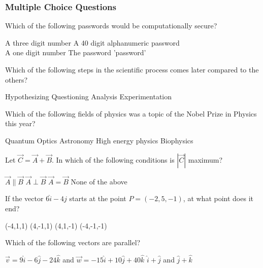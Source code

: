 \documentclass[12pt,addpoints]{exam}
\begin{document}
{{{				\subsubsection*{Multiple Choice Questions}
				\begin{questions}
					\question Which of the following passwords would be computationally secure?\\
					\begin{oneparchoices}
						\choice A three digit number
						\choice A 40 digit alphanumeric password \\
						\choice A one digit number
						\choice The password 'password'
					\end{oneparchoices}
					\question Which of the following steps in the scientific process comes later compared to the others? \\
					\begin{oneparchoices}
						\choice Hypothesizing
						\choice Questioning
						\choice Analysis
						\choice Experimentation
					\end{oneparchoices}
					\question Which of the following fields of physics was a topic of the Nobel Prize in Physics this year? \\
					\begin{oneparchoices}
						\choice Quantum Optics
						\choice Astronomy
						\choice High energy physics
						\choice Biophysics
					\end{oneparchoices}
					\question Let $\vec{C}=\vec{A}+\vec{B}$. In which of the following conditions is $|\vec{C}|$ maximum? \\
					\begin{oneparchoices}
						\choice $\vec{A}\parallel\vec{B}$
						\choice $\vec{A}\perp\vec{B}$
						\choice $\vec{A}=\vec{B}$
						\choice None of the above
					\end{oneparchoices}
					\question If the vector $6\hat{i}-4\hat{j}$ starts at the point $P =(-2,5,-1)$, at what point does it end? \\
					\begin{oneparchoices}
						\choice (-4,1,1)
						\choice (4,-1,1)
						\choice (4,1,-1)
						\choice (-4,-1,-1)
					\end{oneparchoices}
					\question Which of the following vectors are parallel? \\
					\begin{oneparchoices}
						\choice $\vec v = 9\hat i - 6\hat j - 24\hat k$ and $\vec w = -15\hat i+ 10\hat j+ 40\hat k$
						\choice $\hat i + \hat j$ and $\hat j+ \hat k$ \\

\end{oneparchoices}
\end{questions}}}}
\end{document}
